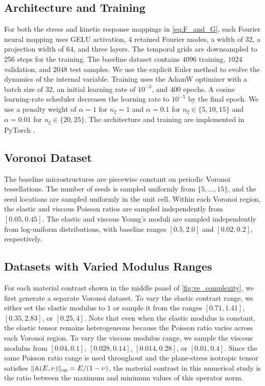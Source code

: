 \subsection{Architecture and Training}\label{app:kv2d_training}
For both the stress and kinetic response mappings in \cref{eq:F_and_G}, each Fourier neural mapping uses GELU activation, $4$ retained Fourier modes, a width of $32$, a projection width of $64$, and three layers. The temporal grids are downsampled to 256 steps for the training. The baseline dataset contains $4096$ training, $1024$ validation, and $2048$ test samples. We use the explicit Euler method to evolve the dynamics of the internal variable. Training uses the AdamW optimizer with a batch size of $32$, an initial learning rate of $10^{-3}$, and $400$ epochs. A cosine learning-rate scheduler decreases the learning rate to $10^{-5}$ by the final epoch. We use a penalty weight of $\alpha=1$ for $n_{\xi}=1$ and $\alpha=0.1$ for $n_{\xi}\in\{5, 10, 15\}$ and $\alpha=0.01$ for $n_{\xi}\in\{20,25\}$. The architecture and training are implemented in PyTorch \cite{paszke2019pytorch}.

\subsection{Voronoi Dataset}\label{app:kv2d_voronoi_dataset}
The baseline microstructures are piecewise constant on periodic Voronoi tessellations. The number of seeds is sampled uniformly from $\{5,\dots,15\}$, and the seed locations are sampled uniformly in the unit cell. Within each Voronoi region, the elastic and viscous Poisson ratios are sampled independently from $[0.05,0.45]$. The elastic and viscous Young's moduli are sampled independently from log-uniform distributions, with baseline ranges $[0.5,2.0]$ and $[0.02,0.2]$, respectively.

\subsection{Datasets with Varied Modulus Ranges}\label{app:kv2d_modulus_ranges}
For each material contrast shown in the middle panel of \cref{fig:ve_complexity}, we first generate a separate Voronoi dataset. To vary the elastic contrast range, we either set the elastic modulus to $1$ or sample it from the ranges $[0.71,1.41]$, $[0.35,2.83]$, or $[0.25,4]$. Note that even when the elastic modulus is constant, the elastic tensor remains heterogeneous because the Poisson ratio varies across each Voronoi region. To vary the viscous modulus range, we sample the viscous modulus from $[0.04,0.1]$, $[0.028,0.14]$, $[0.014,0.28]$, or $[0.01,0.4]$. Since the same Poisson ratio range is used throughout and the plane-stress isotropic tensor satisfies $\|\mathbb{A}(E,\nu)\|_{{\rm op}}=E/(1-\nu)$, the material contrast in this numerical study is the ratio between the maximum and minimum values of this operator norm.

